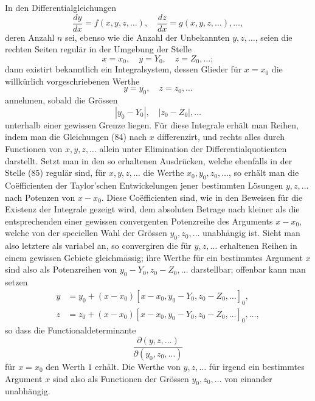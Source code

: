 \documentclass[11pt,a4paper,leqno]{article}
\begin{document}
In den Differentialgleichungen
\begin{equation}\tag{84}
\frac{dy}{dx}=f(x,y,z,\ldots),\quad
\frac{dz}{dx}=g(x,y,z,\ldots),\ldots,
\end{equation}
deren Anzahl $n$ sei, ebenso wie die Anzahl der Unbekannten $y,z,\ldots$, seien die rechten Seiten regulär in der Umgebung der Stelle
\begin{equation}\tag{85}
x=x_0,\quad y=Y_0,\quad z=Z_0,\ldots;
\end{equation}
dann existirt bekanntlich ein Integralsystem, dessen Glieder für $x=x_0$ die willkürlich vorgeschriebenen Werthe
\[
y=y_0,\quad z=z_0,\ldots
\]
annehmen, sobald die Grössen
\[
|y_0-Y_0|,\quad |z_0-Z_0|,\ldots
\]
unterhalb einer gewissen Grenze liegen. Für diese Integrale erhält man Reihen, indem man die Gleichungen (84) nach $x$ differenzirt, und rechts alles durch Functionen von $x,y,z,\ldots$ allein unter Elimination der Differentialquotienten darstellt. Setzt man in den so erhaltenen Ausdrücken, welche ebenfalls in der Stelle (85) regulär sind, für $x,y,z,\ldots$ die Werthe $x_0,y_0,z_0,\ldots$, so erhält man die Coëfficienten der Taylor'schen Entwickelungen jener bestimmten Lösungen $y,z,\ldots$ nach Potenzen von $x-x_0$. Diese Coëfficienten sind, wie in den Beweisen für die Existenz der Integrale gezeigt wird, dem absoluten Betrage nach kleiner als die entsprechenden einer gewissen convergenten Potenzreihe des Arguments $x-x_0$, welche von der speciellen Wahl der Grössen $y_0,z_0,\ldots$ unabhängig ist. Sieht man also letztere als variabel an, so convergiren die für $y,z,\ldots$ erhaltenen Reihen in einem gewissen Gebiete gleichmässig; ihre Werthe für ein bestimmtes Argument $x$ sind also als Potenzreihen von $y_0-Y_0,z_0-Z_0,\ldots$ darstellbar; offenbar kann man setzen
\[
\begin{aligned}
y&=y_0+(x-x_0)[x-x_0,y_0-Y_0,z_0-Z_0,\ldots]_0,\\
z&=z_0+(x-x_0)[x-x_0,y_0-Y_0,z_0-Z_0,\ldots]_0,\ldots,
\end{aligned}
\]
so dass die Functionaldeterminante
\[
\frac{\partial(y,z,\ldots)}{\partial(y_0,z_0,\ldots)}
\]
für $x=x_0$ den Werth $1$ erhält. Die Werthe von $y,z,\ldots$ für irgend ein bestimmtes Argument $x$ sind also als Functionen der Grössen $y_0,z_0,\ldots$ von einander unabhängig.
\end{document}
